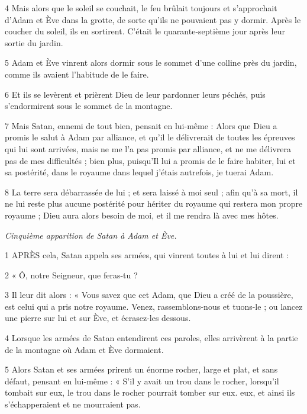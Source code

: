 \par 4 Mais alors que le soleil se couchait, le feu brûlait toujours et s'approchait d'Adam et Ève dans la grotte, de sorte qu'ils ne pouvaient pas y dormir. Après le coucher du soleil, ils en sortirent. C'était le quarante-septième jour après leur sortie du jardin.

\par 5 Adam et Ève vinrent alors dormir sous le sommet d'une colline près du jardin, comme ils avaient l'habitude de le faire.

\par 6 Et ils se levèrent et prièrent Dieu de leur pardonner leurs péchés, puis s'endormirent sous le sommet de la montagne.

\par 7 Mais Satan, ennemi de tout bien, pensait en lui-même : Alors que Dieu a promis le salut à Adam par alliance, et qu'il le délivrerait de toutes les épreuves qui lui sont arrivées, mais ne me l'a pas promis par alliance, et ne me délivrera pas de mes difficultés ; bien plus, puisqu'Il lui a promis de le faire habiter, lui et sa postérité, dans le royaume dans lequel j'étais autrefois, je tuerai Adam.

\par 8 La terre sera débarrassée de lui ; et sera laissé à moi seul ; afin qu'à sa mort, il ne lui reste plus aucune postérité pour hériter du royaume qui restera mon propre royaume ; Dieu aura alors besoin de moi, et il me rendra là avec mes hôtes.


\par \textit{Cinquième apparition de Satan à Adam et Ève.}

\par 1 APRÈS cela, Satan appela ses armées, qui vinrent toutes à lui et lui dirent :

\par 2 « Ô, notre Seigneur, que feras-tu ?

\par 3 Il leur dit alors : « Vous savez que cet Adam, que Dieu a créé de la poussière, est celui qui a pris notre royaume. Venez, rassemblons-nous et tuons-le ; ou lancez une pierre sur lui et sur Ève, et écrasez-les dessous.

\par 4 Lorsque les armées de Satan entendirent ces paroles, elles arrivèrent à la partie de la montagne où Adam et Ève dormaient.

\par 5 Alors Satan et ses armées prirent un énorme rocher, large et plat, et sans défaut, pensant en lui-même : « S'il y avait un trou dans le rocher, lorsqu'il tombait sur eux, le trou dans le rocher pourrait tomber sur eux. eux, et ainsi ils s’échapperaient et ne mourraient pas.

